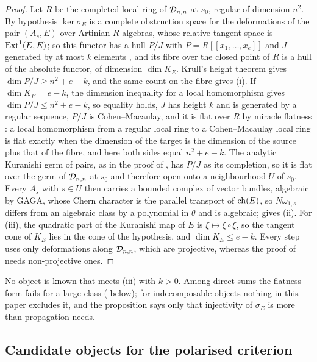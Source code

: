 \begin{proof}
Let $R$ be the completed local ring of $\mathcal{D}_{n,n}$ at $s_{0}$, regular of
dimension $n^{2}$. By hypothesis $\ker\sigma_{E}$ is a complete obstruction
space for the deformations of the pair $(A_{s},E)$ over Artinian $R$-algebras,
whose relative tangent space is $\operatorname{Ext}^{1}(E,E)$; so this functor has a hull
$P/J$ with $P=R[[x_{1},\dots,x_{e}]]$ and $J$ generated by at most $k$
elements \cite{FM98}, and its fibre over the closed point of $R$ is a hull of
the absolute functor, of dimension $\dim K_{E}$. Krull's height theorem gives
$\dim P/J\ge n^{2}+e-k$, and the same count on the fibre gives (i). If
$\dim K_{E}=e-k$, the dimension inequality for a local homomorphism
\cite[Theorem~15.1]{Mat86} gives $\dim P/J\le n^{2}+e-k$, so equality holds, $J$
has height $k$ and is generated by a regular sequence, $P/J$ is
Cohen--Macaulay, and it is flat over $R$ by miracle flatness
\cite[Theorem~23.1]{Mat86}: a local homomorphism from a regular local ring to
a Cohen--Macaulay local ring is flat exactly when the dimension of the target
is the dimension of the source plus that of the fibre, and here both sides
equal $n^{2}+e-k$. The analytic Kuranishi germ of pairs, as in the
proof of , has $P/J$ as its completion, so it is flat over
the germ of $\mathcal{D}_{n,n}$ at $s_{0}$ and therefore open onto a neighbourhood
$U$ of $s_{0}$. Every $A_{s}$ with $s\in U$ then carries a bounded complex of
vector bundles, algebraic by GAGA, whose Chern character is the parallel
transport of $\operatorname{ch}(E)$, so $N\omega_{1,s}$ differs from an algebraic class by a
polynomial in $\theta$ and is algebraic;  gives (ii).
For (iii), the quadratic part of the Kuranishi map of $E$ is
$\xi\mapsto\xi\circ\xi$, so the tangent cone of $K_{E}$ lies in the cone of the
hypothesis, and $\dim K_{E}\le e-k$. Every step uses only deformations along
$\mathcal{D}_{n,n}$, which are projective, whereas the proof of 
needs non-projective ones.
\end{proof}

No object is known that meets (iii) with $k>0$. Among direct sums the
flatness form fails for a large class ( below); for
indecomposable objects nothing in this paper excludes it, and the proposition
says only that injectivity of $\sigma_{E}$ is more than propagation needs.

\subsection{Candidate objects for the polarised criterion}

